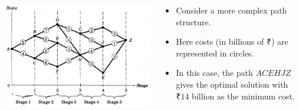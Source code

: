 \documentclass[
  ignorenonframetext,
]{beamer}
\providecommand{\tightlist}{%
  \setlength{\itemsep}{0pt}\setlength{\parskip}{0pt}}\usepackage{longtable,booktabs,array}
\begin{document}
\begin{frame}{}
\label{section-1}
\begin{columns}[T]
\begin{column}{0.7\textwidth}
\includegraphics[width=4\textwidth,height=\textheight]{images/do_paths_complex.png}
\end{column}

\begin{column}{0.3\textwidth}
\begin{itemize}
\tightlist
\item
  Consider a more complex path structure.
\item
  Here costs (in billions of ₹) are represented in circles.
\item
  In this case, the path \(ACEHJZ\) gives the optimal solution with
  \(₹14\) billion as the minimum cost.
\end{itemize}
\end{column}
\end{columns}
\end{frame}
\end{document}
